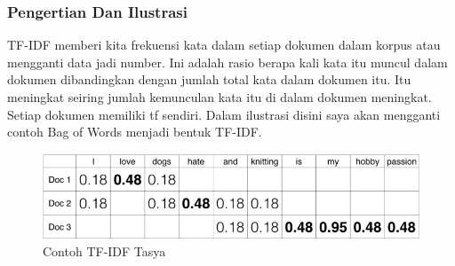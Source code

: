 \subsubsection{Pengertian Dan Ilustrasi}
TF-IDF  memberi kita frekuensi kata dalam setiap dokumen dalam korpus atau mengganti data jadi number. Ini adalah rasio berapa kali kata itu muncul dalam dokumen dibandingkan dengan jumlah total kata dalam dokumen itu. Itu meningkat seiring jumlah kemunculan kata itu di dalam dokumen meningkat. Setiap dokumen memiliki tf sendiri. Dalam ilustrasi disini saya akan mengganti contoh Bag of Words menjadi bentuk TF-IDF.
\begin{figure}[ht]
\centering
\includegraphics[scale=0.5]{figures/chapter4tasya5.png}
\caption{Contoh TF-IDF Tasya}
\label{Contoh}
\end{figure}